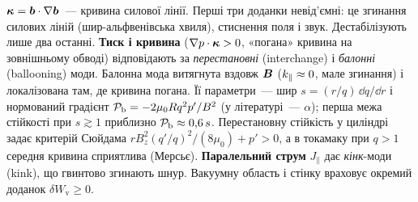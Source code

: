\begin{outofcorpus}
\begin{equation}
\end{equation}
$\bm{\kappa}=\bm{b}\cdot\nabla\bm{b}$~--- кривина силової лінії. Перші три доданки невід'ємні: це згинання силових ліній (шир-альфвенівська хвиля), стиснення поля і звук. Дестабілізують лише два останні. \textbf{Тиск і кривина} ($\nabla p\cdot\bm{\kappa}>0$, «погана» кривина на зовнішньому обводі) відповідають за \emph{перестановні} (interchange) і \emph{балонні} (ballooning) моди. Балонна мода витягнута вздовж $\bm{B}$ ($k_{\parallel}\approx0$, мале згинання) і локалізована там, де кривина погана. Її параметри~--- шир $s=(r/q)\,\dd q/\dd r$ і нормований градієнт $\mathcal{P}_{\mathrm{b}}=-2\mu_0Rq^2p'/B^2$ (у літературі~--- $\alpha$); перша межа стійкості при $s\gtrsim1$ приблизно $\mathcal{P}_{\mathrm{b}}\approx0{,}6\,s$. Перестановну стійкість у циліндрі задає критерій Сюйдама $rB_z^2(q'/q)^2/(8\mu_0)+p'>0$, а в токамаку при $q>1$ середня кривина сприятлива (Мерсьє). \textbf{Паралельний струм} $J_\parallel$ дає \emph{кінк}-моди (kink), що гвинтово згинають шнур. Вакуумну область і стінку враховує окремий доданок $\delta W_{\mathrm v}\ge0$.
\end{outofcorpus}


